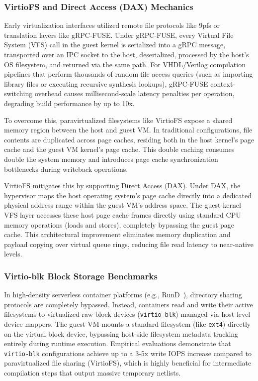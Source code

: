 \subsubsection{VirtioFS and Direct Access (DAX) Mechanics}
Early virtualization interfaces utilized remote file protocols like 9pfs or translation layers like gRPC-FUSE. Under gRPC-FUSE, every Virtual File System (VFS) call in the guest kernel is serialized into a gRPC message, transported over an IPC socket to the host, deserialized, processed by the host's OS filesystem, and returned via the same path. For VHDL/Verilog compilation pipelines that perform thousands of random file access queries (such as importing library files or executing recursive synthesis lookups), gRPC-FUSE context-switching overhead causes millisecond-scale latency penalties per operation, degrading build performance by up to 10x.

To overcome this, paravirtualized filesystems like VirtioFS expose a shared memory region between the host and guest VM. In traditional configurations, file contents are duplicated across page caches, residing both in the host kernel's page cache and the guest VM kernel's page cache. This double caching consumes double the system memory and introduces page cache synchronization bottlenecks during writeback operations.

VirtioFS mitigates this by supporting Direct Access (DAX). Under DAX, the hypervisor maps the host operating system's page cache directly into a dedicated physical address range within the guest VM's address space. The guest kernel VFS layer accesses these host page cache frames directly using standard CPU memory operations (loads and stores), completely bypassing the guest page cache. This architectural improvement eliminates memory duplication and payload copying over virtual queue rings, reducing file read latency to near-native levels.

\subsubsection{Virtio-blk Block Storage Benchmarks}
In high-density serverless container platforms (e.g., RunD~\cite{Li2022RunD}), directory sharing protocols are completely bypassed. Instead, containers read and write their active filesystems to virtualized raw block devices (\texttt{virtio-blk}) managed via host-level device mappers. The guest VM mounts a standard filesystem (like \texttt{ext4}) directly on the virtual block device, bypassing host-side filesystem metadata tracking entirely during runtime execution. Empirical evaluations demonstrate that \texttt{virtio-blk} configurations achieve up to a 3-5x write IOPS increase compared to paravirtualized file sharing (VirtioFS), which is highly beneficial for intermediate compilation steps that output massive temporary netlists.

